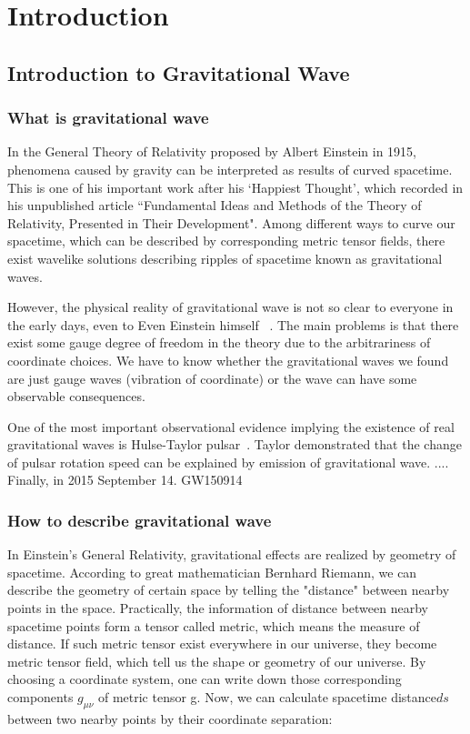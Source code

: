 \chapter{Introduction} 
\section{Introduction to Gravitational Wave}
\subsection{What is gravitational wave}

In the General Theory of Relativity proposed by Albert Einstein in 1915, phenomena caused by gravity can be interpreted as results of curved spacetime. This is one of his important work after his `Happiest Thought', which recorded in his unpublished article ``Fundamental Ideas and Methods of the Theory of Relativity, Presented in Their Development"\cite{Einstein:happy}. Among different ways to curve our spacetime, which can be described by corresponding metric tensor fields, there exist wavelike solutions describing ripples of spacetime known as gravitational waves.

However, the physical reality of gravitational wave is not so clear to everyone in the early days, even to Even Einstein himself ~\cite{Einstein:prl, Einstein:ongw}. The main problems is that there exist some gauge degree of freedom in the theory due to the arbitrariness of coordinate choices. We have to know whether the gravitational waves we found are just gauge waves (vibration of coordinate) or the wave can have some observable consequences. 

One of the most important observational evidence implying the existence of real gravitational waves is Hulse-Taylor pulsar~\cite{HulseTaylor:discovery}. Taylor demonstrated that the change of pulsar rotation speed can be explained by emission of gravitational wave\cite{HulseTaylor:gr}.  
....
Finally, in 2015 September 14.
GW150914

\subsection{How to describe gravitational wave}

In Einstein's General Relativity, gravitational effects are realized by geometry of spacetime. According to great mathematician Bernhard Riemann, we can describe the geometry of certain space by telling the "distance" between nearby points in the space. Practically, the information of distance between nearby spacetime points form a tensor called metric, which means the measure of distance. If such metric tensor exist everywhere in our universe, they become metric tensor field, which tell us the shape or geometry of our universe. By choosing a coordinate system, one can write down those corresponding components $g_{\mu\nu}$ of metric tensor g. Now, we can calculate spacetime distance$ds$ between two nearby points by their coordinate separation:


